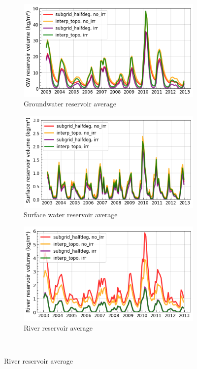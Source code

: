 \begin{figure}[htbp]
    \centering
    \begin{subfigure}[b]{0.32\textwidth}
        \caption{Groundwater reservoir average}
        \includegraphics[width=\textwidth]{images/chap3/time_series/slowr_time_series.png}
    \end{subfigure}
    \begin{subfigure}[b]{0.32\textwidth}
        \caption{Surface water reservoir average}
        \includegraphics[width=\textwidth]{images/chap3/time_series/fastr_time_series.png}
    \end{subfigure}
    \begin{subfigure}[b]{0.32\textwidth}
        \caption{River reservoir average}
        \includegraphics[width=\textwidth]{images/chap3/time_series/streamr_time_series.png}
    \end{subfigure} \\


\end{figure}
